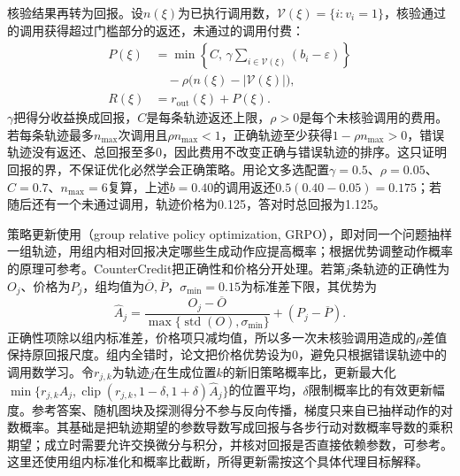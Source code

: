 核验结果再转为回报。设$n(\xi)$为已执行调用数，$\mathcal V(\xi)=\{i:v_i=1\}$，核验通过的调用获得超过门槛部分的返还，未通过的调用付费：
\begin{equation}
  \begin{aligned}
    P(\xi)
      &=\min\left\{C,\,
         \gamma\sum_{i\in\mathcal V(\xi)}(b_i-\varepsilon)\right\}\\
      &\quad-\rho\bigl(n(\xi)-|\mathcal V(\xi)|\bigr),\\
    R(\xi)&=r_{\mathrm{out}}(\xi)+P(\xi).
  \end{aligned}
  \label{eq:vision-countercredit-price}
\end{equation}
$\gamma$把得分收益换成回报，$C$是每条轨迹返还上限，$\rho>0$是每个未核验调用的费用。若每条轨迹最多$n_{\max}$次调用且$\rho n_{\max}<1$，正确轨迹至少获得$1-\rho n_{\max}>0$，错误轨迹没有返还、总回报至多0，因此费用不改变正确与错误轨迹的排序。这只证明回报的界，不保证优化必然学会正确策略。用论文多选配置$\gamma=0.5$、$\rho=0.05$、$C=0.7$、$n_{\max}=6$复算，上述$b=0.40$的调用返还$0.5(0.40-0.05)=0.175$；若随后还有一个未通过调用，轨迹价格为0.125，答对时总回报为1.125。

策略更新使用（group relative policy optimization, GRPO），即对同一个问题抽样一组轨迹，用组内相对回报决定哪些生成动作应提高概率；根据优势调整动作概率的原理可参考。CounterCredit把正确性和价格分开处理。若第$j$条轨迹的正确性为$O_j$、价格为$P_j$，组均值为$\overline O,\overline P$，$\sigma_{\min}=0.15$为标准差下限，其优势为
\begin{equation}
  \widehat A_j=
    \frac{O_j-\overline O}
         {\max\{\operatorname{std}(O),\sigma_{\min}\}}
       +(P_j-\overline P).
  \label{eq:vision-countercredit-advantage}
\end{equation}
正确性项除以组内标准差，价格项只减均值，所以多一次未核验调用造成的$\rho$差值保持原回报尺度。组内全错时，论文把价格优势设为0，避免只根据错误轨迹中的调用数学习。令$r_{j,k}$为轨迹$j$在生成位置$k$的新旧策略概率比，更新最大化$\min\{r_{j,k}\widehat A_j,\operatorname{clip}(r_{j,k},1-\delta,1+\delta)\widehat A_j\}$的位置平均，$\delta$限制概率比的有效更新幅度。参考答案、随机图块及探测得分不参与反向传播，梯度只来自已抽样动作的对数概率。其基础是把轨迹期望的参数导数写成回报与各步行动对数概率导数的乘积期望；成立时需要允许交换微分与积分，并核对回报是否直接依赖参数，可参考。这里还使用组内标准化和概率比截断，所得更新需按这个具体代理目标解释。

